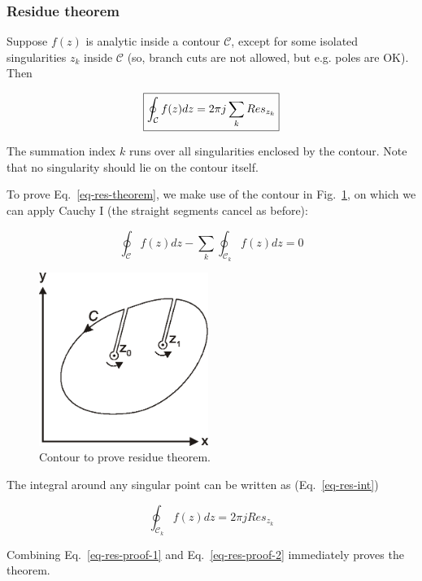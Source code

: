\subsubsection*{Residue theorem}

Suppose $f(z)$ is analytic inside a contour $\mathcal{C}$, except for some
isolated singularities $z_k$ inside $\mathcal{C}$ (so, branch cuts are not
allowed, but e.g. poles are OK). Then

\begin{equation}
\fbox{$\displaystyle
\oint_{\mathcal{C}} f(z) dz = 2 \pi j \sum_k Res_{z_k} \label{eq-res-theorem}
$}
\end{equation} 

The summation index $k$ runs over all singularities enclosed by the contour.
Note that no singularity should lie on the contour itself.

To prove Eq.~\ref{eq-res-theorem}, we make use of the contour in
Fig.~\ref{fig-residue}, on which we can apply Cauchy I (the straight segments
cancel as before):

\begin{equation}
\oint_{\mathcal{C}} f(z) dz - \sum_k \oint_{\mathcal{C}_k} f(z) dz = 0
\label{eq-res-proof-1}
\end{equation}

\begin{figure}
\centering
\includegraphics[width=5.5cm]{complex/figures/residue}
\caption{Contour to prove residue theorem.}
\label{fig-residue}
\end{figure}

The integral around any singular point can be written as (Eq.~\ref{eq-res-int})

\begin{equation}
\oint_{\mathcal{C}_k} f(z) dz = 2 \pi j Res_{z_k} \label{eq-res-proof-2}
\end{equation} 

Combining Eq.~\ref{eq-res-proof-1} and Eq.~\ref{eq-res-proof-2} immediately
proves the theorem.

